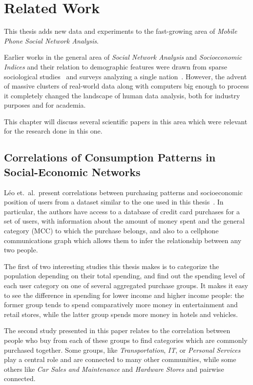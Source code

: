 
\chapter{Related Work}
\label{chap:related_work}


This thesis adds new data and experiments to the fast-growing area of \emph{Mobile Phone Social Network Analysis}.

Earlier works in the general area of \emph{Social Network Analysis} and \emph{Socioeconomic Indices} and their relation to demographic features were drawn from sparse sociological studies~\cite{katz_economics_2001} and  surveys analyzing a single nation~\cite{deaton1997}. However, the advent of massive clusters of real-world data along with computers big enough to process it completely changed the landscape of human data analysis, both for industry purposes and for academia.

This chapter will discuss several scientific papers in this area which were relevant for the research done in this one.

\section{Correlations of Consumption Patterns in Social-Economic Networks}
\label{sec:leo_correlations}

Léo et.\ al.\ present correlations between purchasing patterns and socioeconomic position of users from a dataset similar to the one used in this thesis~\cite{leo2016correlations}. In particular, the authors have access to a database of credit card purchases for a set of users, with information about the amount of money spent and the general category (MCC) to which the purchase belongs, and also to a cellphone communications graph which allows them to infer the relationship between any two people.

The first of two interesting studies this thesis makes is to categorize the population depending on their total spending, and find out the spending level of each user category on one of several aggregated purchase groups. It makes it easy to see the difference in spending for lower income and higher income people: the former group tends to spend comparatively more money in entertainment and retail stores, while the latter group spends more money in hotels and vehicles.

The second study presented in this paper relates to the correlation between people who buy from each of these groups to find categories which are commonly purchased together. Some groups, like \emph{Transportation}, \emph{IT}, or \emph{Personal Services} play a central role and are connected to many other communities, while some others like \emph{Car Sales and Maintenance} and \emph{Hardware Stores} and pairwise connected. 

